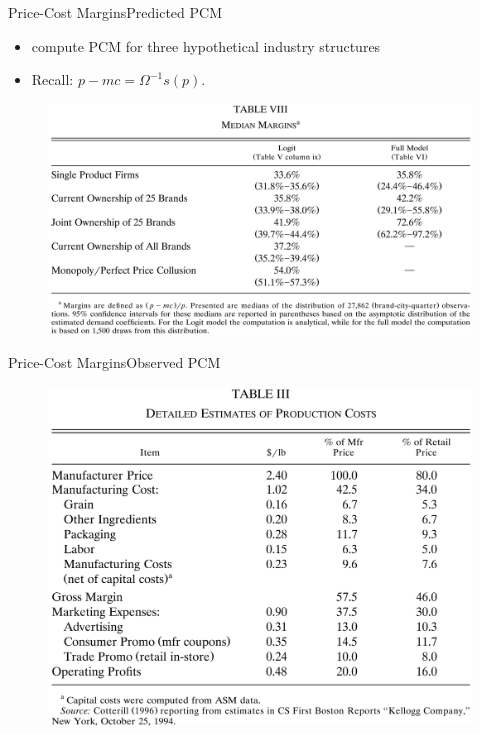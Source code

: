 \documentclass{beamer}
\begin{document}
\begin{frame}[label=table8]{Price-Cost Margins}{Predicted PCM}
	\begin{itemize}
		\item compute PCM for three hypothetical industry structures
		\item Recall: $p-mc=\Omega^{-1}s(p)$.
	\end{itemize}

	\begin{figure}[h]
		\centering
		\includegraphics[scale=0.15]{table8.png}
	\end{figure}
	\hyperlink{logit}{}
\end{frame}
\begin{frame}{Price-Cost Margins}{Observed PCM}
	\begin{figure}[h]
		\centering
		\includegraphics[scale=0.2]{table3.png}
	\end{figure}
\end{frame}
\end{document}
